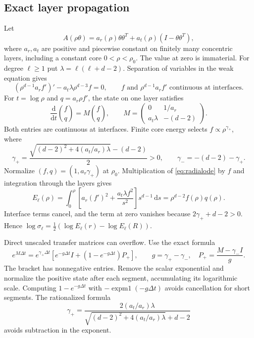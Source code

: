 \documentclass[11pt]{article}
\theoremstyle{remark}
\newcommand{\dd}{\,\mathrm d}
\begin{document}
\subsection{Exact layer propagation}
Let
\[
 A(\rho\theta)=a_r(\rho)\theta\theta^T+a_t(\rho)(I-\theta\theta^T),
\]
where $a_r,a_t$ are positive and piecewise constant on finitely many
concentric layers, including a constant core $0<\rho<\rho_0$.
The value at zero is immaterial. For degree $\ell\ge1$ put
$\lambda=\ell(\ell+d-2)$. Separation of variables in the weak equation
gives
\begin{equation}\label{eq:radialode}
 (\rho^{d-1}a_rf')'-a_t\lambda\rho^{d-3}f=0,
 \qquad f\text{ and }\rho^{d-1}a_rf'\text{ continuous at interfaces}.
\end{equation}
For $t=\log\rho$ and $q=a_r\rho f'$, the state on one layer satisfies
\begin{equation}\label{eq:state}
 \frac{\mathrm d}{\mathrm dt}\binom fq=M\binom fq,\qquad
 M=\begin{pmatrix}0&1/a_r\\a_t\lambda&-(d-2)\end{pmatrix}.
\end{equation}
Both entries are continuous at interfaces. Finite core energy selects
$f\propto\rho^{\gamma_+}$, where
\[
 \gamma_+=\frac{\sqrt{(d-2)^2+4(a_t/a_r)\lambda}-(d-2)}2>0,
 \qquad\gamma_-=-(d-2)-\gamma_+.
\]
Normalize $(f,q)=(1,a_r\gamma_+)$ at $\rho_0$. Multiplication of
\eqref{eq:radialode} by $f$ and integration through the layers gives
\begin{equation}\label{eq:radialenergy}
 E_\ell(\rho)=\int_0^\rho
   \left[a_r(f')^2+\frac{a_t\lambda f^2}{s^2}\right]s^{d-1}\dd s
             =\rho^{d-2}f(\rho)q(\rho).
\end{equation}
Interface terms cancel, and the term at zero vanishes because
$2\gamma_++d-2>0$. Hence
$\log\sigma_\ell=\tfrac12(\log E_\ell(r)-\log E_\ell(R))$.

Direct unscaled transfer matrices can overflow. Use the exact formula
\begin{equation}\label{eq:stable}
 e^{M\Delta t}=e^{\gamma_+\Delta t}
   [e^{-g\Delta t}I+(1-e^{-g\Delta t})P_+],\qquad
 g=\gamma_+-\gamma_-,\quad P_+=\frac{M-\gamma_-I}{g}.
\end{equation}
The bracket has nonnegative entries. Remove the scalar exponential and
normalize the positive state after each segment, accumulating its
logarithmic scale. Computing $1-e^{-g\Delta t}$ with
$-\operatorname{expm1}(-g\Delta t)$ avoids cancellation for short segments.
The rationalized formula
\[
 \gamma_+=\frac{2(a_t/a_r)\lambda}
                  {\sqrt{(d-2)^2+4(a_t/a_r)\lambda}+d-2}
\]
avoids subtraction in the exponent.
\end{document}
